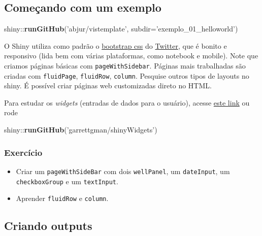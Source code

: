 \documentclass[]{book}
\newenvironment{Shaded}{\begin{snugshade}}{\end{snugshade}}
\newcommand{\KeywordTok}[1]{\textcolor[rgb]{0.13,0.29,0.53}{\textbf{{#1}}}}
\newcommand{\DataTypeTok}[1]{\textcolor[rgb]{0.13,0.29,0.53}{{#1}}}
\newcommand{\StringTok}[1]{\textcolor[rgb]{0.31,0.60,0.02}{{#1}}}
\newcommand{\NormalTok}[1]{{#1}}
\providecommand{\tightlist}{%
  \setlength{\itemsep}{0pt}\setlength{\parskip}{0pt}}
\begin{document}
\subsection{Começando com um exemplo}\label{comecando-com-um-exemplo}

\begin{Shaded}
\begin{Highlighting}[]
\NormalTok{shiny::}\KeywordTok{runGitHub}\NormalTok{(}\StringTok{'abjur/vistemplate'}\NormalTok{, }\DataTypeTok{subdir=}\StringTok{'exemplo_01_helloworld'}\NormalTok{)}
\end{Highlighting}
\end{Shaded}

O Shiny utiliza como padrão o
\href{http://getbootstrap.com/css/}{bootstrap css} do
\href{https://twitter.com}{Twitter}, que é bonito e responsivo (lida bem
com várias plataformas, como notebook e mobile). Note que criamos
páginas básicas com \texttt{pageWithSidebar}. Páginas mais trabalhadas
são criadas com \texttt{fluidPage}, \texttt{fluidRow}, \texttt{column}.
Pesquise outros tipos de layouts no shiny. É possível criar páginas web
customizadas direto no HTML.

Para estudar os \emph{widgets} (entradas de dados para o usuário),
acesse \href{http://shiny.rstudio.com/gallery/widget-gallery.html}{este
link} ou rode

\begin{Shaded}
\begin{Highlighting}[]
\NormalTok{shiny::}\KeywordTok{runGitHub}\NormalTok{(}\StringTok{'garrettgman/shinyWidgets'}\NormalTok{)}
\end{Highlighting}
\end{Shaded}

\subsubsection{Exercício}\label{exercicio}

\begin{itemize}
\tightlist
\item
  Criar um \texttt{pageWithSideBar} com dois \texttt{wellPanel}, um
  \texttt{dateInput}, um \texttt{checkboxGroup} e um \texttt{textInput}.
\item
  Aprender \texttt{fluidRow} e \texttt{column}.
\end{itemize}

\subsection{Criando outputs}\label{criando-outputs}
\end{document}
